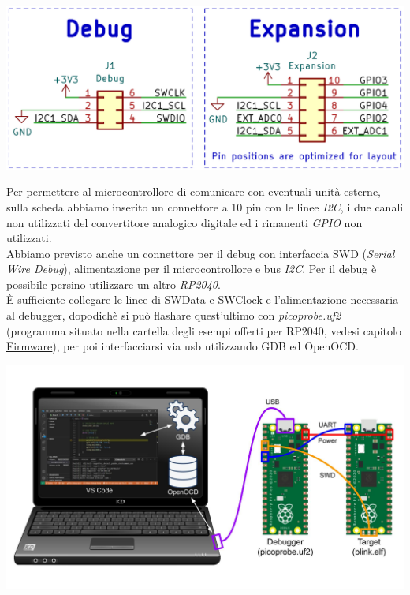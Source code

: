 \begin{center}
\includegraphics[scale=0.2]{figures/image90.png}
\captionsetup{type=figure}
\end{center}

\noindent Per permettere al microcontrollore di comunicare con eventuali unità
esterne, sulla scheda abbiamo inserito un connettore a 10 pin con le
linee \emph{I2C}, i due canali non utilizzati del convertitore analogico
digitale ed i rimanenti \emph{GPIO} non utilizzati.\\
Abbiamo previsto anche un connettore per il debug con interfaccia SWD
(\emph{Serial Wire Debug}), alimentazione per il microcontrollore e bus
\emph{I2C}. Per il debug è possibile persino utilizzare un altro \emph{RP2040}.\\
È sufficiente collegare le linee di SWData e
SWClock e l'alimentazione necessaria al debugger,
dopodichè si può flashare quest'ultimo con \emph{picoprobe.uf2}
(programma situato nella cartella degli esempi offerti per RP2040,
vedesi capitolo
\protect\hyperlink{_w8kvxnysumpc}{\underline{Firmware}}), per poi
interfacciarsi via usb utilizzando GDB ed OpenOCD.

\begin{center}
\includegraphics[scale=0.2]{figures/image18.png}
\captionsetup{type=figure}
\end{center}

